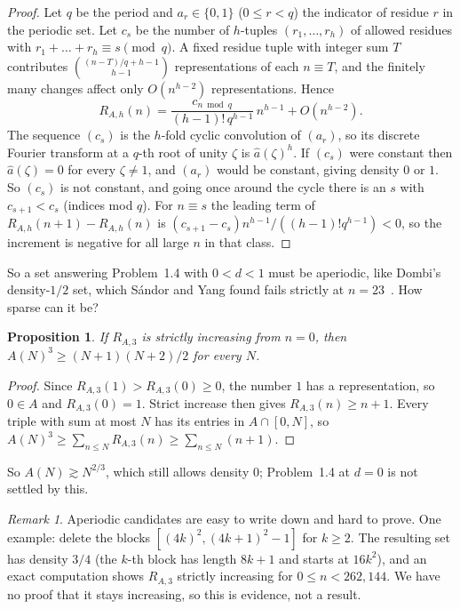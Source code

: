 \documentclass[11pt]{amsart}
\newtheorem{proposition}[theorem]{Proposition}
\theoremstyle{remark}
\newtheorem{remark}[theorem]{Remark}
\begin{document}
\begin{proof}
Let $q$ be the period and $a_r\in\{0,1\}$ ($0\le r<q$) the indicator of residue $r$ in the periodic set. Let $c_s$ be the number of $h$-tuples $(r_1,\dots,r_h)$ of allowed residues with $r_1+\dots+r_h\equiv s\pmod q$. A fixed residue tuple with integer sum $T$ contributes $\binom{(n-T)/q+h-1}{h-1}$ representations of each $n\equiv T$, and the finitely many changes affect only $O(n^{h-2})$ representations. Hence
\[
R_{A,h}(n)=\frac{c_{n\bmod q}}{(h-1)!\,q^{h-1}}\,n^{h-1}+O(n^{h-2}).
\]
The sequence $(c_s)$ is the $h$-fold cyclic convolution of $(a_r)$, so its discrete Fourier transform at a $q$-th root of unity $\zeta$ is $\hat a(\zeta)^h$. If $(c_s)$ were constant then $\hat a(\zeta)=0$ for every $\zeta\ne1$, and $(a_r)$ would be constant, giving density $0$ or $1$. So $(c_s)$ is not constant, and going once around the cycle there is an $s$ with $c_{s+1}<c_s$ (indices mod $q$). For $n\equiv s$ the leading term of $R_{A,h}(n+1)-R_{A,h}(n)$ is $(c_{s+1}-c_s)n^{h-1}/((h-1)!q^{h-1})<0$, so the increment is negative for all large $n$ in that class.
\end{proof}

So a set answering Problem~1.4 with $0<d<1$ must be aperiodic, like Dombi's density-$1/2$ set, which Sándor and Yang found fails strictly at $n=23$~\cite{SY}. How sparse can it be?

\begin{proposition}\label{prop:growth}
If $R_{A,3}$ is strictly increasing from $n=0$, then $A(N)^3\ge(N+1)(N+2)/2$ for every $N$.
\end{proposition}

\begin{proof}
Since $R_{A,3}(1)>R_{A,3}(0)\ge0$, the number $1$ has a representation, so $0\in A$ and $R_{A,3}(0)=1$. Strict increase then gives $R_{A,3}(n)\ge n+1$. Every triple with sum at most $N$ has its entries in $A\cap[0,N]$, so $A(N)^3\ge\sum_{n\le N}R_{A,3}(n)\ge\sum_{n\le N}(n+1)$.
\end{proof}

So $A(N)\gtrsim N^{2/3}$, which still allows density $0$; Problem~1.4 at $d=0$ is not settled by this.

\begin{remark}
Aperiodic candidates are easy to write down and hard to prove. One example: delete the blocks $[(4k)^2,(4k+1)^2-1]$ for $k\ge2$. The resulting set has density $3/4$ (the $k$-th block has length $8k+1$ and starts at $16k^2$), and an exact computation shows $R_{A,3}$ strictly increasing for $0\le n<262{,}144$. We have no proof that it stays increasing, so this is evidence, not a result.
\end{remark}
\end{document}
